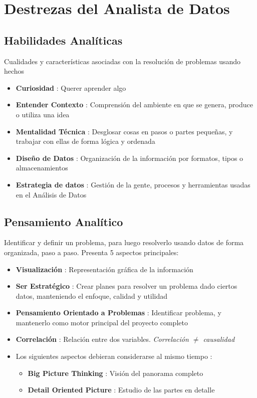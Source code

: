 \section{Destrezas del Analista de Datos}

\subsection{Habilidades Analíticas}
Cualidades y características asociadas con la resolución de problemas usando hechos
\begin{itemize}
    \item {\textbf{Curiosidad} : Querer aprender algo}
    \item {\textbf{Entender Contexto} : Comprensión del ambiente en que se genera, produce o utiliza una idea}
    \item {\textbf{Mentalidad Técnica} : Desglosar cosas en pasos o partes pequeñas, y trabajar con ellas de forma lógica y ordenada}
    \item {\textbf{Diseño de Datos} : Organización de la información por formatos, tipos o almacenamientos}
    \item {\textbf{Estrategia de datos} : Gestión de la gente, procesos y herramientas usadas en el Análisis de Datos}
\end{itemize}

\subsection{Pensamiento Analítico}
Identificar y definir un problema, para luego resolverlo usando datos de forma organizada, paso a paso. Presenta 5 aspectos principales:
\begin{itemize}
    \item {\textbf{Visualización} : Representación gráfica de la información}
    \item {\textbf{Ser Estratégico} : Crear planes para resolver un problema dado ciertos datos, manteniendo el enfoque, calidad y utilidad}
    \item {\textbf{Pensamiento Orientado a Problemas} : Identificar problema, y mantenerlo como motor principal del proyecto completo}
    \item {\textbf{Correlación} : Relación entre dos variables. \textit{Correlación ${\neq}$ causalidad}}
    \item{Los siguientes aspectos debieran considerarse al mismo tiempo :
    \begin{itemize}
        \item {\textbf{Big Picture Thinking} : Visión del panorama completo}
        \item {\textbf{Detail Oriented Picture} : Estudio de las partes en detalle}
    \end{itemize}}
\end{itemize}

